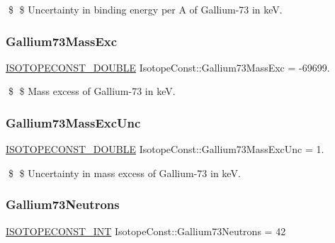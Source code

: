 \$ \$ Uncertainty in binding energy per A of Gallium-\/73 in keV. \mbox{\label{group___isotope_const-_gallium-_ga73_gaa679ec793bf2e24a43a4b0549f5a3177}} 
\subsubsection{\texorpdfstring{Gallium73\+Mass\+Exc}{Gallium73MassExc}}
{\footnotesize\ttfamily \mbox{\hyperlink{group___isotope_const-_macros_ga8f45a7272ce02c0b4c65c44636ed719a}{I\+S\+O\+T\+O\+P\+E\+C\+O\+N\+S\+T\+\_\+\+D\+O\+U\+B\+LE}} Isotope\+Const\+::\+Gallium73\+Mass\+Exc = -\/69699.}

\$ \$ Mass excess of Gallium-\/73 in keV. \mbox{\label{group___isotope_const-_gallium-_ga73_gaaccb317cbdf9cecd8838a6bfc8774b1d}} 
\subsubsection{\texorpdfstring{Gallium73\+Mass\+Exc\+Unc}{Gallium73MassExcUnc}}
{\footnotesize\ttfamily \mbox{\hyperlink{group___isotope_const-_macros_ga8f45a7272ce02c0b4c65c44636ed719a}{I\+S\+O\+T\+O\+P\+E\+C\+O\+N\+S\+T\+\_\+\+D\+O\+U\+B\+LE}} Isotope\+Const\+::\+Gallium73\+Mass\+Exc\+Unc = 1.}

\$ \$ Uncertainty in mass excess of Gallium-\/73 in keV. \mbox{\label{group___isotope_const-_gallium-_ga73_gaedd3b42f5e5d8917a6c8094e7d8ddd66}} 
\subsubsection{\texorpdfstring{Gallium73\+Neutrons}{Gallium73Neutrons}}
{\footnotesize\ttfamily \mbox{\hyperlink{group___isotope_const-_macros_ga5f18360b3e99483a35c32d789e62621c}{I\+S\+O\+T\+O\+P\+E\+C\+O\+N\+S\+T\+\_\+\+I\+NT}} Isotope\+Const\+::\+Gallium73\+Neutrons = 42}

